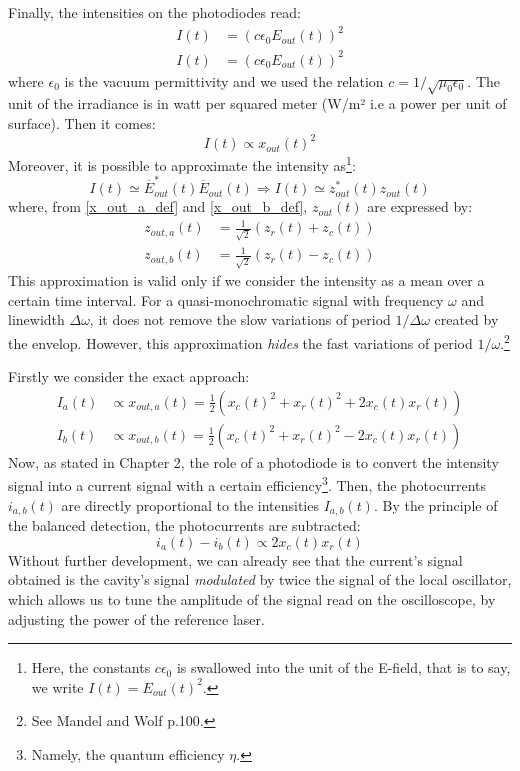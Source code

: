 \documentclass[11pt]{report}
\begin{document}
Finally, the intensities on the photodiodes read:
\begin{align}
I(t) &= \left( c\epsilon_0 E_{out}(t) \right)^2\\
I(t) &= \left( c\epsilon_0 E_{out}(t) \right)^2
\end{align}
where $\epsilon_0$ is the vacuum permittivity and we used the relation $c=1/\sqrt{\mu_0\epsilon_0}$. The unit of the irradiance is in watt per squared meter (W/m² i.e a power per unit of surface). Then it comes:
\begin{equation}
I(t) \propto x_{out}(t)^2
\end{equation}
Moreover, it is possible to approximate the intensity as\footnote{Here, the constants $c\epsilon_0$ is swallowed into the unit of the E-field, that is to say, we write $I(t) = E_{out}(t)^2$.}:
\begin{equation}
I(t) \simeq \overline{E}_{out}^*(t)\overline{E}_{out}(t) \Rightarrow I(t) \simeq z_{out}^*(t)z_{out}(t)
\end{equation}
where, from \eqref{x_out_a_def} and \eqref{x_out_b_def}, $z_{out}(t)$ are expressed by:
\begin{align}
z_{out,a}(t) &= \frac{1}{\sqrt{2}}(z_r(t) + z_c(t))\\
z_{out,b}(t) &= \frac{1}{\sqrt{2}}(z_r(t) - z_c(t))
\end{align}
This approximation is valid only if we consider the intensity as a mean over a certain time interval. For a quasi-monochromatic signal with frequency $\omega$ and linewidth $\Delta\omega$, it does not remove the slow variations of period $1/\Delta\omega$ created by the envelop. However, this approximation \textit{hides} the fast variations of period $1/\omega$.\footnote{See Mandel and Wolf p.100.}

Firstly we consider the exact approach:
\begin{align}
I_a(t) &\propto x_{out,a}(t) = \frac{1}{2} (x_c(t)^2 + x_r(t)^2 + 2x_c(t)x_r(t))\\
I_b(t) &\propto x_{out,b}(t) = \frac{1}{2} (x_c(t)^2 + x_r(t)^2 - 2x_c(t)x_r(t))
\end{align}
Now, as stated in Chapter 2, the role of a photodiode is to convert the intensity signal into a current signal with a certain efficiency\footnote{Namely, the quantum efficiency $\eta$.}. Then, the photocurrents $i_{a,b}(t)$ are directly proportional to the intensities $I_{a,b}(t)$. By the principle of the balanced detection, the photocurrents are subtracted:
\begin{equation}
\label{i_a_minus_i_b}
i_a(t) - i_b(t) \propto 2x_c(t)x_r(t)
\end{equation}
Without further development, we can already see that the current's signal obtained is the cavity's signal \textit{modulated} by twice the signal of the local oscillator, which allows us to tune the amplitude of the signal read on the oscilloscope, by adjusting the power of the reference laser.
\end{document}
